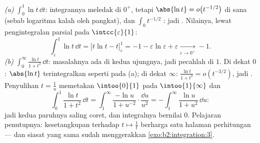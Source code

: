 \begin{example}\label{ex:b2:integration:warmups}
\emph{(a)} $\displaystyle\int_0^1 \ln t\,\dd t$: integrannya
meledak di $0^+$, tetapi $\abs{\ln t} = o\bigl(t^{-1/2}\bigr)$
di sana (sebab logaritma kalah oleh pangkat), dan $\int_0 t^{-1/2}$
: jadi  . Nilainya, lewat pengintegralan parsial
pada $\intcc{\varepsilon}{1}$:
\[
\int_\varepsilon^1 \ln t\,\dd t
= \bigl[t\ln t - t\bigr]_\varepsilon^1
= -1 - \varepsilon\ln\varepsilon + \varepsilon
\xrightarrow[\varepsilon\to0^+]{} -1 .
\]
\emph{(b)} $\displaystyle\int_0^\infty \frac{\ln t}{1 +
t^2}\,\dd t$: masalahnya ada di kedua ujungnya, jadi pecahlah di $1$.
Di dekat $0$: $\abs{\ln t}$ terintegralkan seperti pada (a); di dekat
$\infty$: $\frac{\ln t}{1+t^2} = o(t^{-3/2})$, jadi  .
Penyulihan $t = \frac1u$ memetakan $\intoo{0}{1}$ pada
$\intoo{1}{\infty}$ dan
\[
\int_0^1 \frac{\ln t}{1+t^2}\,\dd t
= \int_1^{\infty} \frac{-\ln u}{1 + u^{-2}}\cdot
\frac{\dd u}{u^2}
= -\int_1^\infty \frac{\ln u}{1+u^2}\,\dd u :
\]
jadi kedua paruhnya saling coret, dan integralnya bernilai $0$.
Pelajaran penutupnya: kesetangkupan terhadap $t \mapsto \frac1t$
berharga satu halaman perhitungan --- dan siasat yang sama sudah
menggerakkan \cref{exo:b2:integration:3}.
\end{example}

